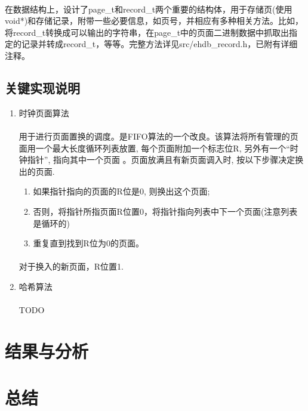 \documentclass{article}
\begin{document}
        \paragraph{}
            在数据结构上，设计了page\_t和record\_t两个重要的结构体，用于存储页(使用void*)和存储记录，附带一些必要信息，如页号，并相应有多种相关方法。比如，将record\_t转换成可以输出的字符串，在page\_t中的页面二进制数据中抓取出指定的记录并转成record\_t，等等。完整方法详见src/ehdb\_record.h，已附有详细注释。
    \subsection{关键实现说明}
        \begin{enumerate}
            \item 时钟页面算法
                \paragraph{}
                    用于进行页面置换的调度。是FIFO算法的一个改良。该算法将所有管理的页面用一个最大长度循环列表放置, 每个页面附加一个标志位R, 另外有一个“时钟指针”, 指向其中一个页面 。页面放满且有新页面调入时, 按以下步骤决定换出的页面.
                    \begin{enumerate}
                        \item 如果指针指向的页面的R位是0, 则换出这个页面;
                        \item 否则，将指针所指页面R位置0，将指针指向列表中下一个页面(注意列表是循环的)
                        \item 重复直到找到R位为0的页面。
                    \end{enumerate}
                \paragraph{}
                    对于换入的新页面，R位置1.
            \item 哈希算法
                \paragraph{}
                    TODO
        \end{enumerate}
\section{结果与分析}
\section{总结}
\end{document}
